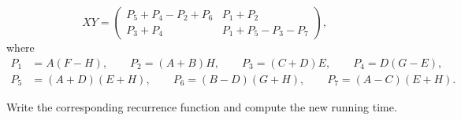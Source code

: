 \documentclass[12pt,a4paper]{article}
\theoremstyle{definition}
\begin{document}
\begin{enumerate}
\begin{enumerate}
\begin{displaymath}
 XY=
\left(\begin{array}{c|c}
P_{5}+P_{4}-P_{2}+P_{6} & P_{1}+P_{2} \\
\hline
P_{3}+P_{4} & P_{1}+P_{5}-P_{3}-P_{7} \end{array}\right),
\end{displaymath}
where
\begin{align*}
P_{1}&=A(F-H), \qquad P_{2}=(A+B)H, \qquad P_{3}=(C+D)E, \qquad P_{4}=D(G-E),\\
P_{5}&=(A+D)(E+H),\qquad P_{6}=(B-D)(G+H),\qquad P_{7}=(A-C)(E+H).
\end{align*}

Write the corresponding recurrence function and compute the new running time.

\end{enumerate}


\end{enumerate}

\end{document}
